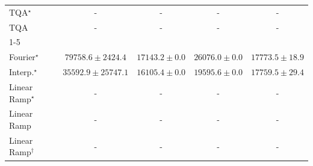 \begin{tabular}{l|cccc|}
TQA$^\star$ & {\cellcolor[HTML]{000000}} \color[HTML]{F1F1F1} {\cellcolor{white}} \color{black} - & {\cellcolor[HTML]{000000}} \color[HTML]{F1F1F1} {\cellcolor{white}} \color{black} - & {\cellcolor[HTML]{000000}} \color[HTML]{F1F1F1} {\cellcolor{white}} \color{black} - & {\cellcolor[HTML]{000000}} \color[HTML]{F1F1F1} {\cellcolor{white}} \color{black} - \\
TQA & {\cellcolor[HTML]{000000}} \color[HTML]{F1F1F1} {\cellcolor{white}} \color{black} - & {\cellcolor[HTML]{000000}} \color[HTML]{F1F1F1} {\cellcolor{white}} \color{black} - & {\cellcolor[HTML]{000000}} \color[HTML]{F1F1F1} {\cellcolor{white}} \color{black} - & {\cellcolor[HTML]{000000}} \color[HTML]{F1F1F1} {\cellcolor{white}} \color{black} - \\
\cline{1-5}
\multicolumn{5}{c}{\rule{0pt}{8pt}PP} \\
\midrule
Fourier$^\star$ & {\cellcolor[HTML]{004529}} \color[HTML]{F1F1F1} $79758.6\pm 2424.4$ & {\cellcolor[HTML]{FBFED2}} \color[HTML]{000000} $17143.2\pm 0.0$ & {\cellcolor[HTML]{E7F6AD}} \color[HTML]{000000} $26076.0\pm 0.0$ & {\cellcolor[HTML]{FBFDCE}} \color[HTML]{000000} $17773.5\pm 18.9$ \\
Interp.$^\star$ & {\cellcolor[HTML]{BCE395}} \color[HTML]{000000} $35592.9\pm 25747.1$ & {\cellcolor[HTML]{FCFED7}} \color[HTML]{000000} $16105.4\pm 0.0$ & {\cellcolor[HTML]{F9FDC4}} \color[HTML]{000000} $19595.6\pm 0.0$ & {\cellcolor[HTML]{FBFDCE}} \color[HTML]{000000} $17759.5\pm 29.4$ \\
Linear Ramp$^\star$ & {\cellcolor[HTML]{000000}} \color[HTML]{F1F1F1} {\cellcolor{white}} \color{black} - & {\cellcolor[HTML]{000000}} \color[HTML]{F1F1F1} {\cellcolor{white}} \color{black} - & {\cellcolor[HTML]{000000}} \color[HTML]{F1F1F1} {\cellcolor{white}} \color{black} - & {\cellcolor[HTML]{000000}} \color[HTML]{F1F1F1} {\cellcolor{white}} \color{black} - \\
Linear Ramp & {\cellcolor[HTML]{000000}} \color[HTML]{F1F1F1} {\cellcolor{white}} \color{black} - & {\cellcolor[HTML]{000000}} \color[HTML]{F1F1F1} {\cellcolor{white}} \color{black} - & {\cellcolor[HTML]{000000}} \color[HTML]{F1F1F1} {\cellcolor{white}} \color{black} - & {\cellcolor[HTML]{000000}} \color[HTML]{F1F1F1} {\cellcolor{white}} \color{black} - \\
Linear Ramp$^\dagger$ & {\cellcolor[HTML]{000000}} \color[HTML]{F1F1F1} {\cellcolor{white}} \color{black} - & {\cellcolor[HTML]{000000}} \color[HTML]{F1F1F1} {\cellcolor{white}} \color{black} - & {\cellcolor[HTML]{000000}} \color[HTML]{F1F1F1} {\cellcolor{white}} \color{black} - & {\cellcolor[HTML]{000000}} \color[HTML]{F1F1F1} {\cellcolor{white}} \color{black} - \\

\end{tabular}
